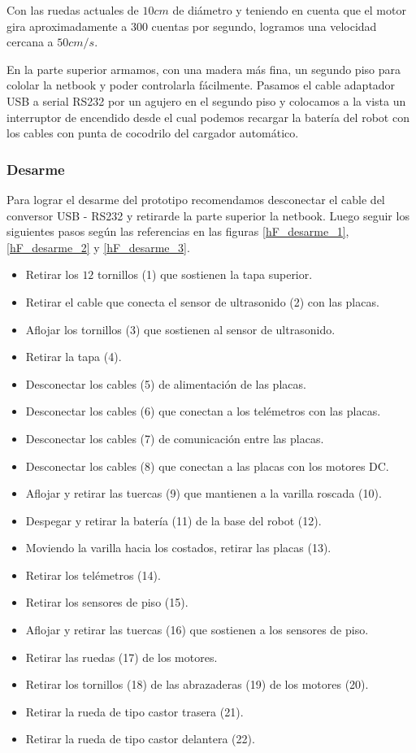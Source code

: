 Con las ruedas actuales de $10cm$ de di\'ametro y teniendo en cuenta que el motor gira aproximadamente
a $300$ cuentas por segundo, logramos una velocidad cercana a $50 cm/s$.

En la parte superior armamos, con una madera m\'as fina, un segundo piso para cololar la netbook y poder
controlarla f\'acilmente.
Pasamos el cable adaptador USB a serial RS232 por un agujero en el segundo piso y colocamos a la vista
un interruptor de encendido desde el cual podemos recargar la bater\'ia del robot con los cables con
punta de cocodrilo del cargador autom\'atico.

\subsubsection{Desarme}
\label{h_prototipo_desarme}

Para lograr el desarme del prototipo recomendamos desconectar el cable del conversor USB - RS232 y
retirarde la parte superior la netbook.
Luego seguir los siguientes pasos seg\'un las referencias en las figuras \ref{hF_desarme_1}, \ref{hF_desarme_2} y \ref{hF_desarme_3}.

\begin{itemize}
 \item Retirar los $12$ tornillos (1) que sostienen la tapa superior.
 \item Retirar el cable que conecta el sensor de ultrasonido (2) con las placas.
 \item Aflojar los tornillos (3) que sostienen al sensor de ultrasonido.
 \item Retirar la tapa (4).
 \item Desconectar los cables (5) de alimentaci\'on de las placas.
 \item Desconectar los cables (6) que conectan a los tel\'emetros con las placas.
 \item Desconectar los cables (7) de comunicaci\'on entre las placas.
 \item Desconectar los cables (8) que conectan a las placas con los motores DC.
 \item Aflojar y retirar las tuercas (9) que mantienen a la varilla roscada (10).
 \item Despegar y retirar la bater\'ia (11) de la base del robot (12).
 \item Moviendo la varilla hacia los costados, retirar las placas (13).
 \item Retirar los tel\'emetros (14).
 \item Retirar los sensores de piso (15).
 \item Aflojar y retirar las tuercas (16) que sostienen a los sensores de piso.
 \item Retirar las ruedas (17) de los motores.
 \item Retirar los tornillos (18) de las abrazaderas (19) de los motores (20).
 \item Retirar la rueda de tipo castor trasera (21).
 \item Retirar la rueda de tipo castor delantera (22).
\end{itemize}


